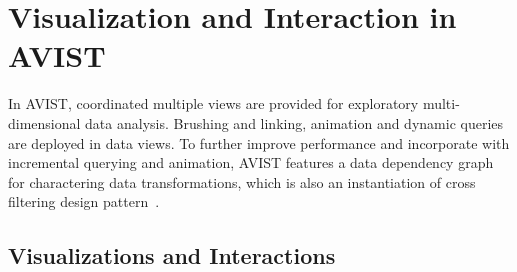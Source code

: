 \documentclass[journal]{vgtc}                %
\begin{document}
{%
 












\section{Visualization and Interaction in AVIST}

In AVIST, coordinated multiple views are provided for exploratory multi-dimensional data analysis. Brushing and linking, animation and dynamic queries are deployed in data views. To further improve performance and incorporate with incremental querying and animation, AVIST features a data dependency graph for charactering data transformations, which is also an instantiation of cross filtering design pattern~\cite{weaver2010cross}.  


\subsection{Visualizations and Interactions}

}
\end{document}
